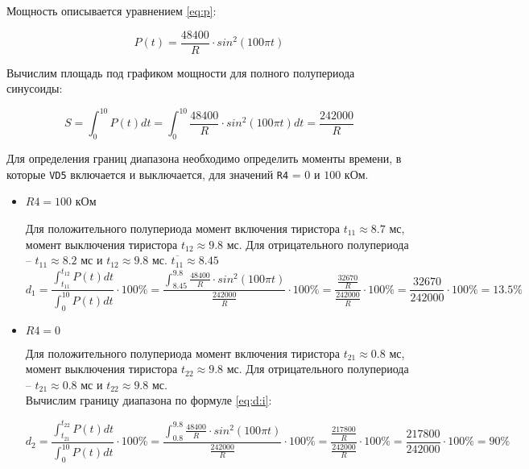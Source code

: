 Мощность описывается уравнением \ref{eq:p}:

\begin{equation}
\label{eq:p}
	P(t) = \frac{48400}{R} \cdot sin^2 \left(100 \pi t \right)
\end{equation}

Вычислим площадь под графиком мощности для полного полупериода синусоиды:

\begin{displaymath}
	S = \int_{0}^{10} P(t) dt = \int_{0}^{10} \frac{48400}{R} \cdot sin^2 \left(100 \pi t \right) dt = \frac{242000}{R}
\end{displaymath}

Для определения границ диапазона необходимо определить моменты времени, в которые \verb+VD5+ включается и выключается, для значений \verb+R4+ = $0$ и $100$ кОм.

\begin{itemize}

	\item $R4 = 100$ кОм
	
		Для положительного полупериода момент включения тиристора $t_{11} \approx 8.7$ мс, момент выключения тиристора $t_{12} \approx 9.8$ мс. Для отрицательного полупериода -- $t_{11} \approx 8.2$ мс и $t_{12} \approx 9.8$ мс. $\overline{{t_{11}}} \approx 8.45$\\
		
		\begin{displaymath}
			d_1 = \frac{\int_{t_{11}}^{t_{12}} P(t) dt}{\int_{0}^{10} P(t) dt} \cdot 100\% = \frac{\int_{8.45}^{9.8} \frac{48400}{R} \cdot sin^2 \left(100 \pi t \right)}{\frac{242000}{R}} \cdot 100\% = \frac{\frac{32670}{R}}{\frac{242000}{R}} \cdot 100\% = \frac{32670}{242000} \cdot 100\% = 13.5 \%
		\end{displaymath}		
		
	\item $R4 = 0$
	
		Для положительного полупериода момент включения тиристора $t_{21} \approx 0.8$ мс, момент выключения тиристора $t_{22} \approx 9.8$ мс. Для отрицательного полупериода -- $t_{21} \approx 0.8$ мс и $t_{22} \approx 9.8$ мс.\\
		Вычислим границу диапазона по формуле \ref{eq:d:i}:
		
		\begin{displaymath}
			d_2 = \frac{\int_{t_{21}}^{t_{22}} P(t) dt}{\int_{0}^{10} P(t) dt} \cdot 100\% = \frac{\int_{0.8}^{9.8} \frac{48400}{R} \cdot sin^2 \left(100 \pi t \right)}{\frac{242000}{R}} \cdot 100\% = \frac{\frac{217800}{R}}{\frac{242000}{R}} \cdot 100\% = \frac{217800}{242000} \cdot 100\% = 90 \%
		\end{displaymath}
		
\end{itemize}

